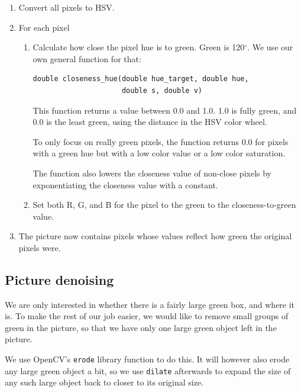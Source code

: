 \documentclass[a4paper,12pt]{article}
\begin{document}
\begin{enumerate}
\item 

Convert all pixels to HSV.

\item 	

For each pixel


\begin{enumerate}
\item

Calculate how close the pixel hue is to green.  Green is 120$^{\circ}$.  We use
our own general function for that:

\begin{verbatim}
double closeness_hue(double hue_target, double hue, 
                     double s, double v)
\end{verbatim}

This function returns a value between 0.0 and 1.0.  1.0 is fully green, and 0.0
is the least green, using the distance in the HSV color wheel.

To only focus on really green pixels, the function returns 0.0 for pixels with a
green hue but with a low color value or a low color saturation.

The function also lowers the closeness value of non-close pixels by
exponentiating the closeness value with a constant.

\item Set both R, G, and B for the pixel to the green to the closeness-to-green
value.

\end{enumerate}
\item The picture now contains pixels whose values reflect how green the
original pixels were.
\end{enumerate}


\subsection{Picture denoising}

We are only interested in whether there is a fairly large green box, and where
it is.  To make the rest of our job easier, we would like to remove small groups
of green in the picture, so that we have only one large green object left in the
picture.

We use OpenCV's \texttt{erode} library function to do this.  It will however
also erode any large green object a bit, so we use \texttt{dilate} afterwards to
expand the size of any such large object back to closer to its original size.
\end{document}
